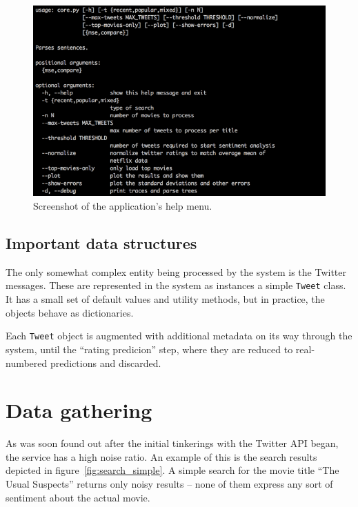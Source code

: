 \begin{figure}[h]
  \centering
    \includegraphics[width=.9\textwidth]{Figures/tool_help}
  \caption{Screenshot of the application's help menu.}
  \label{fig:tool_help}
\end{figure}

\subsection{Important data structures} %
\label{sub:data_structures}

The only somewhat complex entity being processed by the system is the Twitter messages. These are represented in the system as instances a simple \verb+Tweet+ class. It has a small set of default values and utility methods, but in practice, the objects behave as dictionaries.

Each \verb+Tweet+ object is augmented with additional metadata on its way through the system, until the ``rating predicion'' step, where they are reduced to real-numbered predictions and discarded.

\section{Data gathering} %
\label{sec:data_gathering_impl}

As was soon found out after the initial tinkerings with the Twitter API began, the service has a high noise ratio. An example of this is the search results depicted in figure~\ref{fig:search_simple}. A simple search for the movie title ``The Usual Suspects'' returns only noisy results -- none of them express any sort of sentiment about the actual movie.

